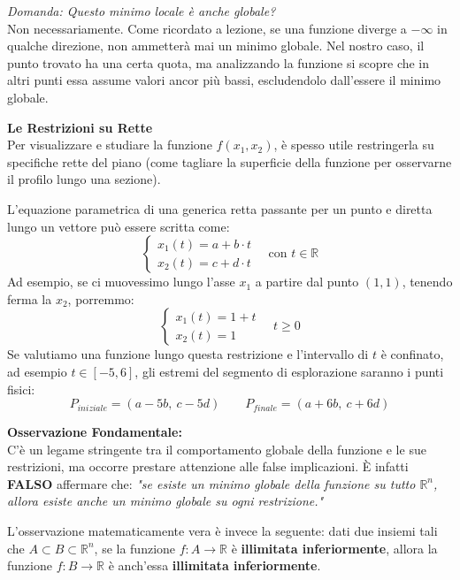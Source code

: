 \documentclass[12pt, a4paper]{article}
\newcommand{\separatore}{\noindent{\color{titlecolor!50}\rule{\textwidth}{0.6pt}}}
\begin{document}
	\textit{Domanda: Questo minimo locale è anche globale?}\\
	Non necessariamente. Come ricordato a lezione, se una funzione diverge a $-\infty$ in qualche direzione, non ammetterà mai un minimo globale. Nel nostro caso, il punto trovato ha una certa quota, ma analizzando la funzione si scopre che in altri punti essa assume valori ancor più bassi, escludendolo dall'essere il minimo globale.
	
	\vspace{0.4cm}
	\separatore
	\vspace{0.4cm}
	
	\textbf{Le Restrizioni su Rette}\\
	Per visualizzare e studiare la funzione $f(x_1, x_2)$, è spesso utile restringerla su specifiche rette del piano (come tagliare la superficie della funzione per osservarne il profilo lungo una sezione).
	
	L'equazione parametrica di una generica retta passante per un punto e diretta lungo un vettore può essere scritta come:
	\[
	\begin{cases}
		x_1(t) = a + b \cdot t \\
		x_2(t) = c + d \cdot t 
	\end{cases}
	\quad \text{con } t \in \mathbb{R}
	\]
	Ad esempio, se ci muovessimo lungo l'asse $x_1$ a partire dal punto $(1,1)$, tenendo ferma la $x_2$, porremmo:
	\[
	\begin{cases}
		x_1(t) = 1 + t \\
		x_2(t) = 1
	\end{cases}
	\quad t \ge 0
	\]
	Se valutiamo una funzione lungo questa restrizione e l'intervallo di $t$ è confinato, ad esempio $t \in [-5, 6]$, gli estremi del segmento di esplorazione saranno i punti fisici:
	\[ P_{iniziale} = (a - 5b, \ c - 5d) \qquad P_{finale} = (a + 6b, \ c + 6d) \]
	
	\textbf{Osservazione Fondamentale:}\\
	C'è un legame stringente tra il comportamento globale della funzione e le sue restrizioni, ma occorre prestare attenzione alle false implicazioni. È infatti \textbf{FALSO} affermare che: \textit{"se esiste un minimo globale della funzione su tutto $\mathbb{R}^n$, allora esiste anche un minimo globale su ogni restrizione."}
	
	L'osservazione matematicamente vera è invece la seguente: dati due insiemi tali che $A \subset B \subset \mathbb{R}^n$, se la funzione $f : A \to \mathbb{R}$ è \textbf{illimitata inferiormente}, allora la funzione $f : B \to \mathbb{R}$ è anch'essa \textbf{illimitata inferiormente}.
	
\end{document}
